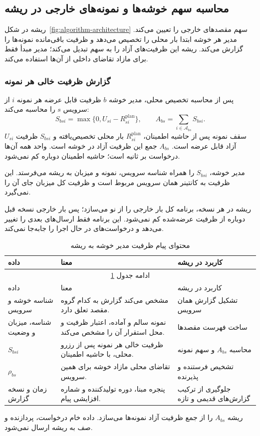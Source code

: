 \subsection{محاسبه سهم خوشه‌ها و نمونه‌های خارجی در ریشه}
\label{sec:root}

ریشه در شکل~\ref{fig:algorithm-architecture} سهم مقصدهای خارجی را تعیین می‌کند. مدیر هر خوشه ابتدا بار محلی را تخصیص می‌دهد و ظرفیت باقی‌مانده نمونه‌ها را گزارش می‌کند. ریشه این ظرفیت‌های آزاد را به سهم تبدیل می‌کند؛ مدیر مبدأ فقط برای مازاد تقاضای داخلی از آن‌ها استفاده می‌کند.

\subsubsection{گزارش ظرفیت خالی هر نمونه}

پس از محاسبه تخصیص محلی، مدیر خوشه $b$ ظرفیت قابل عرضه هر نمونه $i$ از سرویس $s$ را محاسبه می‌کند:
\begin{equation}
 S_{bsi}=\max\{0,U_{si}-R^{\mathrm{plan}}_{si}\},\qquad
 A_{bs}=\sum_{i\in\mathcal A_{bs}}S_{bsi}.
 \label{eq:root-available}
\end{equation}
$U_{si}$ سقف نمونه پس از حاشیه اطمینان، $R^{\mathrm{plan}}_{si}$ بار محلی تخصیص‌یافته و $S_{bsi}$ ظرفیت آزاد قابل عرضه است. $A_{bs}$ جمع این ظرفیت آزاد در خوشه است. واحد همه آن‌ها درخواست بر ثانیه است؛ حاشیه اطمینان دوباره کم نمی‌شود.

مدیر خوشه، $S_{bsi}$ را همراه شناسه سرویس، نمونه و میزبان به ریشه می‌فرستد. این ظرفیت به کانتینر همان سرویس مربوط است و ظرفیت کل میزبان جای آن را نمی‌گیرد.

ریشه در هر نسخه، برنامه کل بار خارجی را از نو می‌سازد؛ پس بار خارجی نسخه قبل دوباره از ظرفیت عرضه‌شده کم نمی‌شود. این برنامه فقط ارسال‌های بعدی را تغییر می‌دهد و درخواست‌های در حال اجرا را جابه‌جا نمی‌کند.

\begin{longtable}{p{3cm}p{6.2cm}p{4cm}}
\caption{محتوای پیام ظرفیت مدیر خوشه به ریشه}\label{tab:root-message}\\
\toprule داده & معنا & کاربرد در ریشه \\
\midrule\endfirsthead
\multicolumn{3}{c}{ادامه جدول \ref{tab:root-message}}\\
\toprule داده & معنا & کاربرد در ریشه \\
\midrule\endhead\bottomrule\endfoot
شناسه خوشه و سرویس & مشخص می‌کند گزارش به کدام گروه مقصد تعلق دارد. & تشکیل گزارش همان سرویس \\
شناسه، میزبان و وضعیت & نمونه سالم و آماده، اعتبار ظرفیت و محل استقرار آن را مشخص می‌کند. & ساخت فهرست مقصدها \\
$S_{bsi}$ & ظرفیت خالی هر نمونه پس از رزرو محلی، با حاشیه اطمینان. & محاسبه $A_{bs}$ و سهم نمونه \\
$\rho_{bs}$ & تقاضای محلی مازاد خوشه برای همین سرویس. & تشخیص فرستنده و پذیرنده \\
زمان و نسخه گزارش & پنجره مبنا، دوره تولیدکننده و شماره افزایشی پیام. & جلوگیری از ترکیب گزارش‌های قدیمی و تازه \\
\end{longtable}
ریشه $A_{bs}$ را از جمع ظرفیت آزاد نمونه‌ها می‌سازد. داده خام درخواست، پردازنده و صف به ریشه ارسال نمی‌شود.

